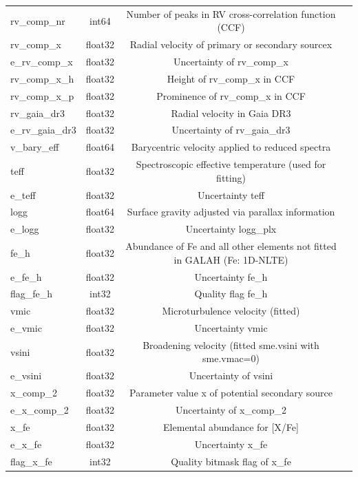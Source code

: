 \documentclass[
  journal=pasa,
  manuscript=research-paper, %
  year=2023,
  volume=37
]{cup-journal}
\begin{document}
\begin{table}
\begin{tabular}{lccc}
rv\_comp\_nr	&	int64	&	Number of peaks in RV cross-correlation function (CCF)	&		\\
rv\_comp\_x	&	float32	&	Radial velocity of primary or secondary sourcex	&		\\
e\_rv\_comp\_x	&	float32	&	Uncertainty of rv\_comp\_x	&		\\
rv\_comp\_x\_h	&	float32	&	Height of rv\_comp\_x in CCF	&		\\
rv\_comp\_x\_p	&	float32	&	Prominence of rv\_comp\_x in CCF	&		\\
rv\_gaia\_dr3	&	float32	&	Radial velocity in Gaia DR3	&		\\
e\_rv\_gaia\_dr3	&	float32	&	Uncertainty of rv\_gaia\_dr3	&		\\
v\_bary\_eff	&	float64	&	Barycentric velocity applied to reduced spectra	&		\\
teff	&	float32	&	Spectroscopic effective temperature (used for fitting)	&		\\
e\_teff	&	float32	&	Uncertainty teff	&		\\
logg	&	float64	&	Surface gravity adjusted via parallax information	&		\\
e\_logg	&	float32	&	Uncertainty logg\_plx	&		\\
fe\_h	&	float32	&	Abundance of Fe and all other elements not fitted in GALAH (Fe: 1D-NLTE)	&		\\
e\_fe\_h	&	float32	&	Uncertainty fe\_h	&		\\
flag\_fe\_h	&	int32	&	Quality flag fe\_h	&		\\
vmic	&	float32	&	Microturbulence velocity (fitted)	&		\\
e\_vmic	&	float32	&	Uncertainty vmic	&		\\
vsini	&	float32	&	Broadening velocity (fitted sme.vsini with sme.vmac=0)	&		\\
e\_vsini	&	float32	&	Uncertainty of vsini	&		\\
x\_comp\_2	&	float32	&	Parameter value x of potential secondary source	&		\\
e\_x\_comp\_2	&	float32	&	Uncertainty of x\_comp\_2	&		\\
x\_fe	&	float32	&	Elemental abundance for [X/Fe]	&		\\
e\_x\_fe	&	float32	&	Uncertainty x\_fe	&		\\
flag\_x\_fe	&	int32	&	Quality bitmask flag of x\_fe	&		\\
\hline
\end{tabular}
\end{table}
\end{document}
